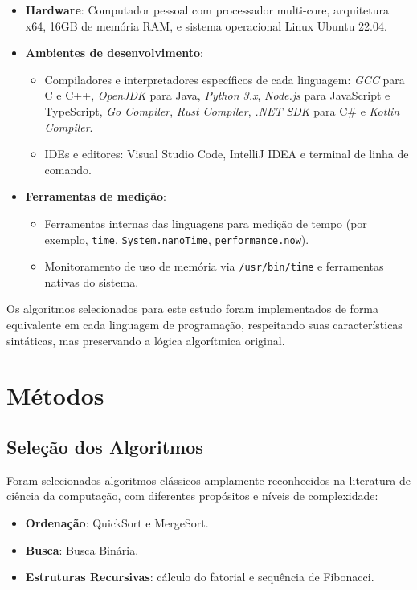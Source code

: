 \documentclass[12pt,oneside,a4paper]{report}
\begin{document}
\begin{itemize}
    \item \textbf{Hardware}: Computador pessoal com processador multi-core, arquitetura x64, 16GB de memória RAM, e sistema operacional Linux Ubuntu 22.04.
    \item \textbf{Ambientes de desenvolvimento}: 
    \begin{itemize}
        \item Compiladores e interpretadores específicos de cada linguagem: \textit{GCC} para C e C++, \textit{OpenJDK} para Java, \textit{Python 3.x}, \textit{Node.js} para JavaScript e TypeScript, \textit{Go Compiler}, \textit{Rust Compiler}, \textit{.NET SDK} para C\# e \textit{Kotlin Compiler}.
        \item IDEs e editores: Visual Studio Code, IntelliJ IDEA e terminal de linha de comando.
    \end{itemize}
    \item \textbf{Ferramentas de medição}: 
    \begin{itemize}
        \item Ferramentas internas das linguagens para medição de tempo (por exemplo, \texttt{time}, \texttt{System.nanoTime}, \texttt{performance.now}).
        \item Monitoramento de uso de memória via \texttt{/usr/bin/time} e ferramentas nativas do sistema.
    \end{itemize}
\end{itemize}

Os algoritmos selecionados para este estudo foram implementados de forma equivalente em cada linguagem de programação, respeitando suas características sintáticas, mas preservando a lógica algorítmica original.

\section{Métodos}

\subsection{Seleção dos Algoritmos}

Foram selecionados algoritmos clássicos amplamente reconhecidos na literatura de ciência da computação, com diferentes propósitos e níveis de complexidade:

\begin{itemize}
    \item \textbf{Ordenação}: QuickSort e MergeSort.
    \item \textbf{Busca}: Busca Binária.
    \item \textbf{Estruturas Recursivas}: cálculo do fatorial e sequência de Fibonacci.
\end{itemize}
\end{document}
